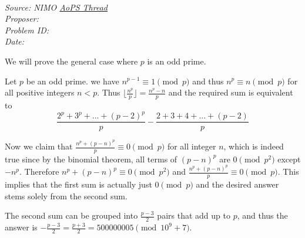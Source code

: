 \SSbreak\\
\emph{Source: NIMO \href{https://artofproblemsolving.com/community/q1h1182685p5731709}{AoPS Thread}}\\
\emph{Proposer: \Pchan}\\
\emph{Problem ID:}\\
\emph{Date: }\\
\SSbreak

\bigskip

\begin{solution}\hfil\medskip

We will prove the general case where $p$ is an odd prime.

Let $p$ be an odd prime. we have $n^{p-1} \equiv 1 \pmod{p}$ and thus $n^p \equiv n \pmod{p}$ for all positive integers $n < p$. Thus $\lfloor \frac{n^p}{p}\rfloor = \frac{n^p - n}{p}$ and the required sum is equivalent to \[\frac{2^p + 3^p + ... + (p-2)^p}{p} - \frac{2 + 3 + 4+... + (p-2)}{p}\]

Now we claim that $\frac{n^p + (p-n)^p}{p} \equiv 0 \pmod{p}$ for all integer $n$, which is indeed true since by the binomial theorem, all terms of $(p-n)^p$  are $0 \pmod{p^2}$ except $-n^p$. Therefore $n^p + (p-n)^p \equiv 0 \pmod{p^2}$ and $\frac{n^p + (p-n)^p}{p} \equiv 0 \pmod{p}$.
This implies that the first sum is actually just $0 \pmod{p}$ and the desired answer stems solely from the second sum.

The second sum can be grouped into $\frac{p-3}{2}$ pairs that add up to $p$, and thus the answer is $- \frac{p-3}{2} = \frac{p+3}{2} = \boxed{500000005} \pmod{10^9 +7}$.
\end{solution}
